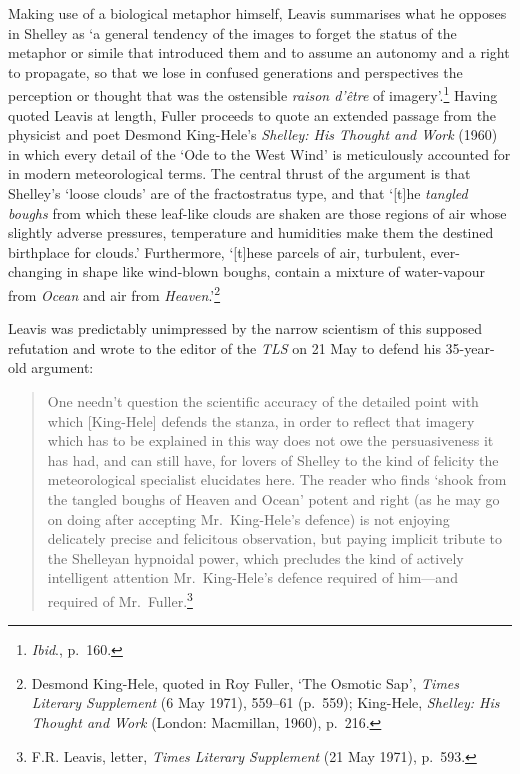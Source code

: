 \documentclass[]{article}
\begin{document}
\noindent Making use of a biological metaphor himself, Leavis summarises
what he opposes in Shelley as ‘a general tendency of the images to
forget the status of the metaphor or simile that introduced them and to
assume an autonomy and a right to propagate, so that we lose in confused
generations and perspectives the perception or thought that was the
ostensible \emph{raison d’être} of imagery’.\footnote{\emph{Ibid}.,
  p.~160.} Having quoted Leavis at length, Fuller proceeds to quote an
extended passage from the physicist and poet Desmond King-Hele’s
\emph{Shelley: His Thought and Work} (1960) in which every detail of the
‘Ode to the West Wind’ is meticulously accounted for in modern
meteorological terms. The central thrust of the argument is that
Shelley’s ‘loose clouds’ are of the fractostratus type, and that
‘{[}t{]}he \emph{tangled boughs} from which these leaf-like clouds are
shaken are those regions of air whose slightly adverse pressures,
temperature and humidities make them the destined birthplace for
clouds.’ Furthermore, ‘{[}t{]}hese parcels of air, turbulent,
ever-changing in shape like wind-blown boughs, contain a mixture of
water-vapour from \emph{Ocean} and air from \emph{Heaven}.’\footnote{Desmond
  King-Hele, quoted in Roy Fuller, ‘The Osmotic Sap’, \emph{Times
  Literary Supplement} (6 May 1971), 559–61 (p.~559); King-Hele,
  \emph{Shelley: His Thought and Work} (London: Macmillan, 1960),
  p.~216.}

Leavis was predictably unimpressed by the narrow scientism of this
supposed refutation and wrote to the editor of the \emph{TLS} on 21 May
to defend his 35-year-old argument:

\begin{quote}
\singlespacing One needn’t question the scientific accuracy of the
detailed point with which {[}King-Hele{]} defends the stanza, in order
to reflect that imagery which has to be explained in this way does not
owe the persuasiveness it has had, and can still have, for lovers of
Shelley to the kind of felicity the meteorological specialist elucidates
here. The reader who finds ‘shook from the tangled boughs of Heaven and
Ocean’ potent and right (as he may go on doing after accepting
Mr.~King-Hele’s defence) is not enjoying delicately precise and
felicitous observation, but paying implicit tribute to the Shelleyan
hypnoidal power, which precludes the kind of actively intelligent
attention Mr.~King-Hele’s defence required of him—and required of
Mr.~Fuller.\footnote{F.R. Leavis, letter, \emph{Times Literary
  Supplement} (21 May 1971), p.~593.}
\end{quote}
\end{document}
